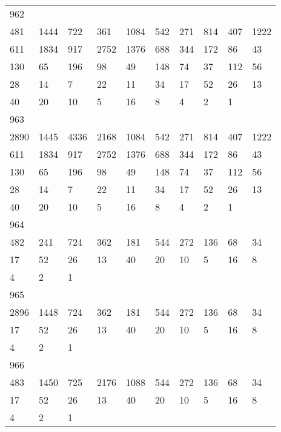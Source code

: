 \begin{longtable}{*{10}{l}}
962&&&&&&&&&\\
481& 1444& 722& 361& 1084& 542& 271& 814& 407& 1222\\
611& 1834& 917& 2752& 1376& 688& 344& 172& 86& 43\\
130& 65& 196& 98& 49& 148& 74& 37& 112& 56\\
28& 14& 7& 22& 11& 34& 17& 52& 26& 13\\
40& 20& 10& 5& 16& 8& 4& 2& 1& \\

963&&&&&&&&&\\
2890& 1445& 4336& 2168& 1084& 542& 271& 814& 407& 1222\\
611& 1834& 917& 2752& 1376& 688& 344& 172& 86& 43\\
130& 65& 196& 98& 49& 148& 74& 37& 112& 56\\
28& 14& 7& 22& 11& 34& 17& 52& 26& 13\\
40& 20& 10& 5& 16& 8& 4& 2& 1& \\

964&&&&&&&&&\\
482& 241& 724& 362& 181& 544& 272& 136& 68& 34\\
17& 52& 26& 13& 40& 20& 10& 5& 16& 8\\
4& 2& 1& \\

965&&&&&&&&&\\
2896& 1448& 724& 362& 181& 544& 272& 136& 68& 34\\
17& 52& 26& 13& 40& 20& 10& 5& 16& 8\\
4& 2& 1& \\

966&&&&&&&&&\\
483& 1450& 725& 2176& 1088& 544& 272& 136& 68& 34\\
17& 52& 26& 13& 40& 20& 10& 5& 16& 8\\
4& 2& 1& \\


\end{longtable}

